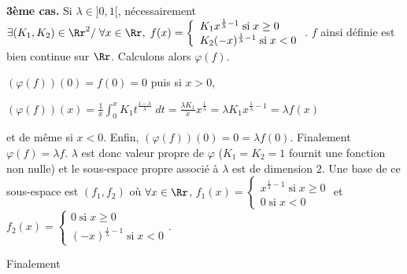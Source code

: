 {\begin{enumerate}
{\textbf{3ème cas.} Si $\lambda\in]0,1[$, nécessairement $\exists(K_1,K_2)\in\Rr^2/\;\forall x\in\Rr,\;f(x)=\left\{
\begin{array}{l}
K_1x^{\frac{1}{\lambda}-1}\;\text{si}\;x\geq0\\
K_2(-x)^{\frac{1}{\lambda}-1}\;\text{si}\;x < 0
\end{array}
\right.$. $f$ ainsi définie est bien continue sur $\Rr$. Calculons alors $\varphi(f)$.

 
$(\varphi(f))(0)=f(0)=0$ puis si $x > 0$,

\begin{center}
$(\varphi(f))(x)=\frac{1}{x}\int_{0}^{x}K_1t^{\frac{1-\lambda}{\lambda}}\;dt=\frac{\lambda K_1}{x}x^{\frac{1}{\lambda}}=\lambda K_1 x^{\frac{1}{\lambda}-1}=\lambda f(x)$
\end{center}

et de même si $x < 0$. Enfin, $(\varphi(f))(0)=0=\lambda f(0)$. Finalement $\varphi(f) =\lambda f$. $\lambda$ est donc valeur propre de $\varphi$ ($K_1 = K_2 = 1$ fournit une fonction non nulle) et le sous-espace propre associé à $\lambda$ est de dimension $2$. Une base de ce sous-espace est $(f_1,f_2)$ où $\forall x\in\Rr$, $f_1(x)=\left\{
\begin{array}{l}
x^{\frac{1}{\lambda}-1}\;\text{si}\;x\geq0\\
0\;\text{si}\;x < 0
\end{array}
\right.$ et $f_2(x) =\left\{
\begin{array}{l}
0\;\text{si}\;x\geq0\\
(-x)^{\frac{1}{\lambda}-1}\;\text{si}\;x < 0
\end{array}
\right.$.

Finalement

\begin{center}
\shadowbox{
$\text{Sp}(\varphi)= ]0,1]$.
}
\end{center}}
\end{enumerate}
}